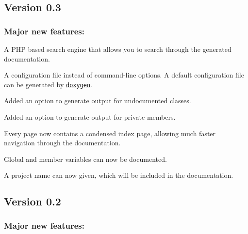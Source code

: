 \subsection*{Version 0.3}

\subsubsection*{Major new features:}


\begin{DoxyItemize}
\item A PHP based search engine that allows you to search through the generated documentation. 
\item A configuration file instead of command-\/line options. A default configuration file can be generated by \href{doxygen_usage.html}{\tt doxygen}. 
\item Added an option to generate output for undocumented classes. 
\item Added an option to generate output for private members. 
\item Every page now contains a condensed index page, allowing much faster navigation through the documentation. 
\item Global and member variables can now be documented. 
\item A project name can now given, which will be included in the documentation. 
\end{DoxyItemize}

\subsection*{Version 0.2}

\subsubsection*{Major new features:}


